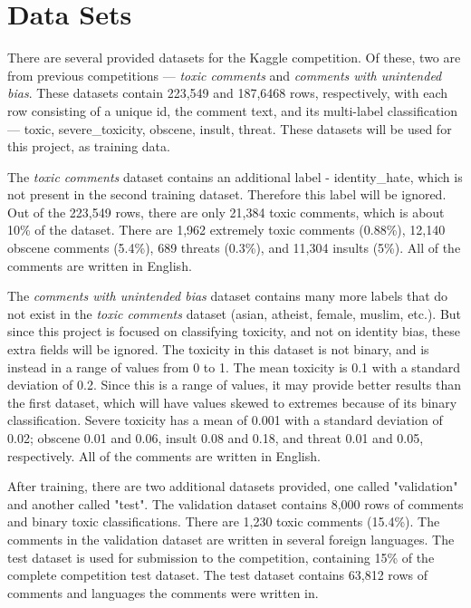 \documentclass{article}
\begin{document}
\section{Data Sets}

There are several provided datasets for the Kaggle competition. Of these, two are from previous competitions --- \textit{toxic comments} and \textit{comments with unintended bias}. These datasets contain 223,549 and 187,6468 rows, respectively, with each row consisting of a unique id, the comment text, and its multi-label classification --- toxic, severe\_toxicity, obscene, insult, threat. These datasets will be used for this project, as training data.

The \textit{toxic comments} dataset contains an additional label - identity\_hate, which is not present in the second training dataset. Therefore this label will be ignored. Out of the 223,549 rows, there are only 21,384 toxic comments, which is about 10\% of the dataset. There are 1,962 extremely toxic comments (0.88\%), 12,140 obscene comments (5.4\%), 689 threats (0.3\%), and 11,304 insults (5\%). All of the comments are written in English.

The \textit{comments with unintended bias} dataset contains many more labels that do not exist in the \textit{toxic comments} dataset (asian, atheist, female, muslim, etc.). But since this project is focused on classifying toxicity, and not on identity bias, these extra fields will be ignored. The toxicity in this dataset is not binary, and is instead in a range of values from 0 to 1. The mean toxicity is 0.1 with a standard deviation of 0.2. Since this is a range of values, it may provide better results than the first dataset, which will have values skewed to extremes because of its binary classification. Severe toxicity has a mean of 0.001 with a standard deviation of 0.02; obscene 0.01 and 0.06, insult 0.08 and 0.18, and threat 0.01 and 0.05, respectively. All of the comments are written in English.

After training, there are two additional datasets provided, one called "validation" and another called "test". The validation dataset contains 8,000 rows of comments and binary toxic classifications. There are 1,230 toxic comments (15.4\%). The comments in the validation dataset are written in several foreign languages. The test dataset is used for submission to the competition, containing 15\% of the complete competition test dataset. The test dataset contains 63,812 rows of comments and languages the comments were written in.
\end{document}
